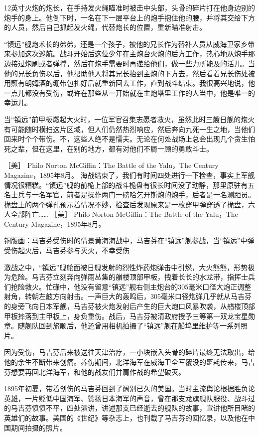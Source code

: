 \documentclass[12pt,UTF8]{ctexbook}
\begin{document}
12英寸火炮的炮长，在手持发火绳瞄准时被击中头部，头骨的碎片打在他身边别的炮手的身上。他倒下时，一名在下一层平台上的炮手抱住他的腰，并将其交给下方的人员，然后自己抓起发火绳，代替炮长的位置，重新瞄准射击。

“镇远”舰炮术长的弟弟，还是一个孩子，被他的兄长作为替补人员从威海卫家乡带来参加这次巡航。战斗开始后这位少年在主炮台火炮的后方工作，热心地从炮手那边接过炮刷或者弹撑，然后在炮手需要时再递给他们，做一些力所能及的活儿。当他的兄长负伤以后，他帮助他人将其兄长抬到主炮的下方去，然后看着兄长伤处被用蘸有朗姆酒的绷带包扎好后就重新回去工作，直到战斗结束。我很高兴地说，他一点儿都没有受伤，或许在那些从一开始就在主炮塔里工作的人当中，他是唯一的幸运儿。

当“镇远”前甲板燃起大火时，一位军官召集志愿者救火，虽然此时三艘日舰的炮火有可能随时横扫这片区域，但人们仍然热烈响应，然后奔向九死一生之地，当他们回来时个个带伤。不，这些人绝不是懦夫。无论在何处战场上总会出现几个贪生怕死之辈，但在这里，在别的地方，都有对他们不屑一顾的勇敢斗士。

［美］ Philo Norton McGiffin：The Battle of the Yalu，The Century Magazine，1895年8月。
海战结束了，我们有时间四处进行一下检查，事实上军舰情况很糟糕。“镇远”舰的前桅上部的战斗桅盘有很长时间没了动静，那里原驻有五名士兵与一名军官，前者是操作两门一磅哈乞开斯炮的炮手，后者是一名测距员。桅盘上的两个弹孔预示着情况不妙，检查后发现原来是一枚穿甲弹穿透了桅盘，六人全部阵亡…… ［美］ Philo Norton McGiffin：The Battle of the Yalu，The Century Magazine，1895年8月。


铜版画：马吉芬受伤时的情景黄海海战中，马吉芬在“镇远”舰参战，当“镇远”中弹受伤起火后，马吉芬参与灭火，不幸受伤

激战之中，“镇远”舰舱面被日舰发射的烈性炸药炮弹击中引燃，大火熊熊，形势极为危险。马吉芬立刻奔向弹雨丛集的艏楼顶部甲板，拽着长长的水龙带，指挥士兵们抢险救火。忙碌中，他没有留意“镇远”舰右侧主炮台的305毫米口径大炮正调整射角，转朝左舷方向射击。一声巨大的轰鸣后，305毫米口径炮弹几乎就从马吉芬的身旁飞向日本军舰，马吉芬被火炮发射后产生的巨大炮口风暴吹袭，从艏楼顶部甲板摔落到主甲板上，身负重伤。战后，马吉芬被清政府授予三等第一双龙宝星勋章。随舰队回到旅顺后，他还曾用相机拍摄了“镇远”舰在船坞里维护等一系列照片。

因为受伤，马吉芬后来被送往天津治疗，一小块嵌入头骨的碎片最终无法取出，给他的余生不断带来创痛。养伤期间，北洋海军在威海卫全军覆没的噩耗传来，马吉芬想要再回北洋海军，和他的战友们并肩作战的希望破灭。

1895年初夏，带着创伤的马吉芬回到了阔别已久的美国。当时主流舆论根据胜负论英雄，一片贬低中国海军、赞扬日本海军的声音，曾在那支龙旗舰队服役、战斗过的马吉芬愤愤不平，四处演讲，讲述那支已经逝去的舰队的故事，宣讲他所目睹的英雄们的故事。美国的《世纪》等杂志上，也刊载了马吉芬的回忆录，以及他在中国期间拍摄的照片。
\end{document}
